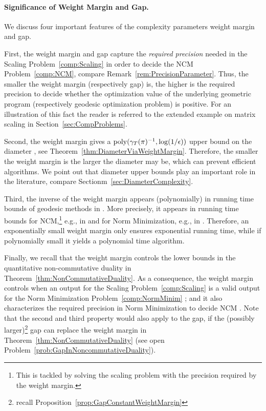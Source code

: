 \paragraph{Significance of Weight Margin and Gap.}
We discuss four important features of the complexity parameters weight margin and gap.

First, the weight margin and gap capture the \emph{required precision} needed in the Scaling Problem~\ref{comp:Scaling} in order to decide the NCM Problem~\ref{comp:NCM}, compare Remark~\ref{rem:PrecisionParameter}. Thus, the smaller the weight margin (respectively gap)  is, the higher is the required precision to decide whether the optimization value of the underlying geometric program (respectively geodesic optimization problem) is positive. For an illustration of this fact the reader is referred to the extended example on matrix scaling in Section~\ref{sec:CompProblems}.

Second, the weight margin gives a $\operatorname{poly}(\gamma_T(\pi)^{-1}, \log(1/\epsilon))$ upper bound on the diameter \cite{GradflowArXiv}, see Theorem~\ref{thm:DiameterViaWeightMargin}. Therefore, the smaller the weight margin is the larger the diameter may be, which can prevent efficient algorithms. We point out that diameter upper bounds play an important role in the literature, compare Sectionm~\ref{sec:DiameterComplexity}.

Third, the inverse of the weight margin appears (polynomially) in running time bounds of geodesic methods in \cite{GradflowArXiv}. More precisely, it appears in running time bounds for NCM,\footnote{This is tackled by solving the scaling problem with the precision required by the weight margin.}
e.g., in \cite[Corollary~1.26]{GradflowArXiv} and for Norm Minimization, e.g., in \cite[Theorem~1.22]{GradflowArXiv}. Therefore, an exponentially small weight margin only ensures exponential running time, while if polynomially small it yields a polynomial time algorithm.

Finally, we recall that the weight margin controls the lower bounds in the quantitative non-commutative duality in Theorem~\ref{thm:NonCommutativeDuality}.
As a consequence, the weight margin controls when an output for the Scaling Problem~\ref{comp:Scaling} is a valid output for the Norm Minimization Problem~\ref{comp:NormMinim} \cite[Corollary~1.18]{GradflowArXiv}; and it also characterizes the required precision in Norm Minimization to decide NCM \cite[Corollary~1.19]{GradflowArXiv}.
Note that the second and third property would also apply to the gap, if the (possibly larger)\footnote{recall Proposition~\ref{prop:GapConstantWeightMargin}} gap can replace the weight margin in Theorem~\ref{thm:NonCommutativeDuality} (see open Problem~\ref{prob:GapInNoncommutativeDuality}).




